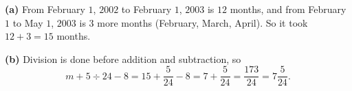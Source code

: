 \textbf{(a)} From February $1$, $2002$ to February $1$, $2003$ is $12$ months, and from February $1$ to May $1$, $2003$ is $3$ more months (February, March, April). So it took $12+3=\boxed{15}$ months.

\textbf{(b)} Division is done before addition and subtraction, so
\[m+5\div24-8=15+\dfrac{5}{24}-8=7+\dfrac{5}{24}=\boxed{\dfrac{173}{24}}=7\dfrac{5}{24}.\]
